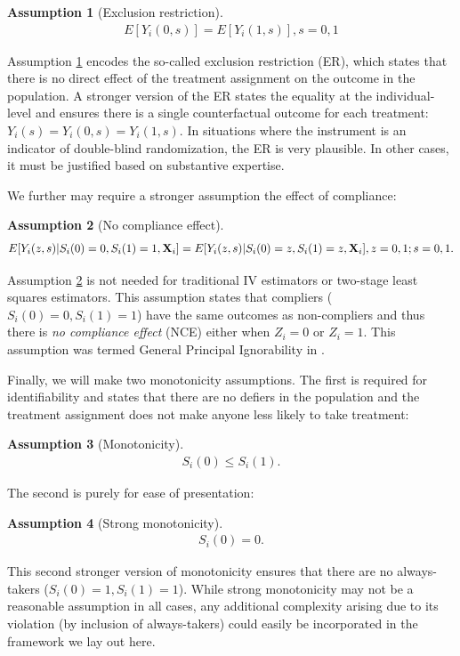 \documentclass{article}
\newtheorem{assumption}{Assumption}
\begin{document}
\begin{assumption}[Exclusion restriction]\label{er}
\begin{align*}
    E[Y_i(0, s)] = E[Y_i(1, s)], s = 0, 1 \label{er}
    \end{align*}
\end{assumption} 
Assumption \ref{er} encodes the so-called exclusion restriction (ER), which states that there is no direct effect of the treatment assignment on the outcome in the population. A stronger version of the ER states the equality at the individual-level and ensures there is a single counterfactual outcome for each treatment: $Y_i(s) = Y_i(0, s) = Y_i(1,s)$. In situations where the instrument is an indicator of double-blind randomization, the ER is very plausible. In other cases, it must be justified based on substantive expertise. 

We further may require a stronger assumption the effect of compliance:
\begin{assumption}[No compliance effect]\label{nce}
\begin{align*}
    E[Y_i(z, s) | S_i(0) = 0, S_i(1) = 1, {\bf X}_i] = E[Y_i(z, s) | S_i(0) = z, S_i(1) = z, {\bf X}_i], z = 0, 1; s = 0, 1. 
    \end{align*}
\end{assumption}
Assumption \ref{nce} is not needed for traditional IV estimators or two-stage least squares estimators. This assumption states that compliers ($S_i(0) = 0, S_i(1) = 1$) have the same outcomes as non-compliers and thus there is \textit{no compliance effect} (NCE) either when $Z_i = 0$ or $Z_i = 1$. This assumption was termed General Principal Ignorability  in \cite{Ding2017}.

Finally, we will make two monotonicity assumptions. The first is required for identifiability and states that there are no defiers in the population and the treatment assignment does not make anyone less likely to take treatment:
\begin{assumption}[Monotonicity]\label{monotonicity}
\begin{align*}
S_i(0) \leq S_i(1). 
\end{align*}
\end{assumption}
The second is purely for ease of presentation:
\begin{assumption}[Strong monotonicity]\label{strong_monotonicity}
\begin{align*}
S_i(0) = 0. 
\end{align*}
\end{assumption}
This second stronger version of monotonicity ensures that there are no always-takers ($S_i(0) = 1, S_i(1) = 1$). While strong monotonicity may not be a reasonable assumption in all cases, any additional complexity arising due to its violation (by inclusion of always-takers) could easily be incorporated in the framework we lay out here. 
\end{document}
